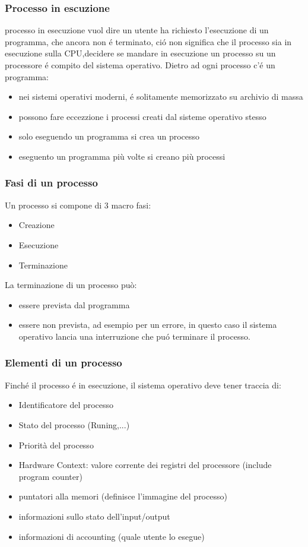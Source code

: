 \documentclass[11pt]{article}
\begin{document}
\subsubsection{Processo in escuzione}
processo in esecuzione vuol dire un utente ha richiesto l'esecuzione di un programma, che ancora non é terminato,
ció non significa che il processo sia in esecuzione sulla CPU,decidere se mandare in esecuzione un processo su un
processore é compito del sistema operativo.
Dietro ad ogni processo c'é un programma:
\begin{itemize}
    \item nei sistemi operativi moderni, é solitamente memorizzato su archivio di massa
    \item possono fare eccezzione i processi creati dal sisteme operativo stesso
    \item solo eseguendo un programma si crea un processo
    \item eseguento un programma più volte si creano più processi
\end{itemize}
\subsubsection{Fasi di un processo}
Un processo si compone di 3 macro fasi:
\begin{itemize}
    \item Creazione
    \item Esecuzione
    \item Terminazione
\end{itemize}
La terminazione di un processo può:
\begin{itemize}
    \item essere prevista dal programma
    \item essere non prevista, ad esempio per un errore, in questo caso il sistema operativo lancia una interruzione che puó terminare il processo.
\end{itemize}
\subsubsection{Elementi di un processo}
Finché il processo é in esecuzione, il sistema operativo deve tener traccia di:
\begin{itemize}
    \item Identificatore del processo
    \item Stato del processo (Runing,...)
    \item Priorità del processo
    \item Hardware Context: valore corrente dei registri del processore (include program counter)
    \item puntatori alla memori (definisce l'immagine del processo)
    \item informazioni sullo stato dell'input/output
    \item informazioni di accounting (quale utente lo esegue)
\end{itemize}
\end{document}
